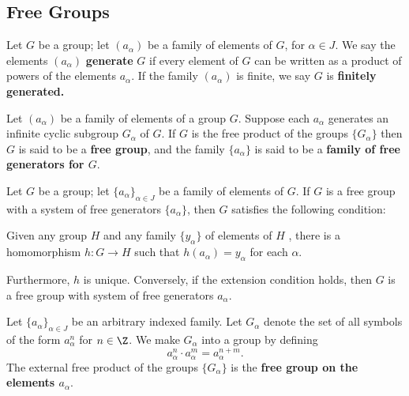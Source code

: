 \subsection{Free Groups}

\begin{definition}[Generate]
Let $G$ be a group; let $(a_\alpha)$ be a family of elements of $G$, for $\alpha \in J$. We say the elements 
$(a_\alpha)$ \textbf{generate} $G$ if every element of $G$ can be written as a product of powers of the elements $a_\alpha$. 
If the family $(a_\alpha)$ is finite, we say $G$ is \textbf{finitely generated.}
\end{definition}

\begin{definition}
Let $(a_\alpha)$ be a family of elements of a group $G$. Suppose each $a_\alpha$ generates an infinite cyclic subgroup $G_\alpha$ of $G$. 
If $G$ is the free product of the groups $\{ G_\alpha \}$ then $G$ is said to be a \textbf{free group}, 
and the family $\{ a_\alpha \}$ is said to be a \textbf{family of free generators for $G$}.
\end{definition}

\begin{lemma}
    Let $G$ be a group; let $\{ a_\alpha \}_{\alpha \in J}$ be a family of elements of $G$. If $G$ is a free group with a system of free generators $\{ a_\alpha \}$, then $G$ satisfies the following condition:
        
    \begin{addmargin}{1em}
        Given any group $H$ and any family $\{ y_\alpha \}$ of elements of $H$ , 
        there is a homomorphism $h \colon G \rightarrow H$ such that $h(a_\alpha) = y_\alpha$ for each $\alpha$. 
    \end{addmargin}
    
    Furthermore, $h$ is unique. Conversely, if the extension condition holds, then $G$ is a free group with system of free generators $a_\alpha$.
\end{lemma}

\begin{definition}
Let $\{ a_\alpha \}_{\alpha \in J}$ be an arbitrary indexed family. Let $G_\alpha$ denote the set of all symbols of the form $a_\alpha^n$ for $n \in \Z$. We make $G_\alpha$ into a group by defining
\[
    a_\alpha^n \cdot a_\alpha^m = a_\alpha^{n+m}.
\]
The external free product of the groups $\{ G_\alpha \}$ is the \textbf{free group on the elements $a_\alpha$}. 
\end{definition}

